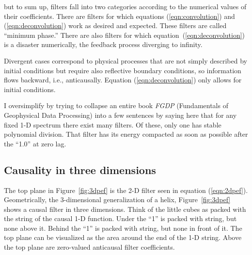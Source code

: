 but to sum up, filters fall into two categories according to the
numerical values of their coefficients.
There are filters for which equations
(\ref{eqn:convolution}) and
(\ref{eqn:deconvolution})
work as desired and expected.
These filters are called ``minimum phase.''
There are also filters for which
equation~(\ref{eqn:deconvolution}) is a disaster numerically,
the feedback process diverging to infinity.
\par
Divergent cases correspond to physical processes
that are not simply described by initial conditions
but require also reflective boundary conditions,
so information flows backward, i.e., anticausally.
Equation (\ref{eqn:deconvolution})
only allows for initial conditions.
\par
I oversimplify by trying to collapse an entire book 
{\em FGDP} (Fundamentals of Geophysical Data Processing)
into a few sentences by saying here that
for any fixed 1-D spectrum there exist many filters.
Of these, only one has
stable polynomial division.
That filter has its energy compacted
as soon as possible after the ``1.0'' at zero lag.

\par


\subsection{Causality in three dimensions}
The top plane in Figure~\ref{fig:3dpef} 
is the 2-D filter seen in equation (\ref{eqn:2dpef}).
Geometrically, the 3-dimensional generalization of a helix,
Figure~\ref{fig:3dpef} shows a causal filter in three dimensions.
Think of the little cubes as packed with the string of the causal 1-D function.
Under the ``1'' is packed with string, but none above it.
Behind the ``1'' is packed with string, but none in front of it.
The top plane can be visualized as the area around the end of the 1-D string.
Above the top plane are zero-valued anticausal filter coefficients.

